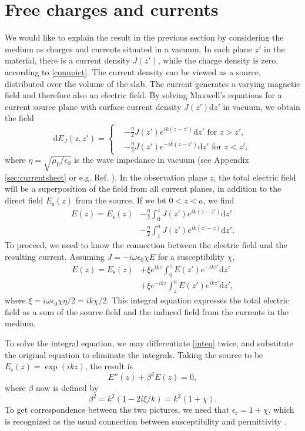 \documentclass[prb,twocolumn]{revtex4-1}
\newcommand{\diff}{\text{d}}
\newcommand{\be}{\begin{equation}}
\newcommand{\ee}{\end{equation}}
\begin{document}
\section{Free charges and currents}\label{sec:free}
We would like to explain the result in the previous section by considering the medium as charges and currents situated in a vacuum. In each plane $z'$ in the material, there is a current density $J(z')$, while the charge density is zero, according to \eqref{connpict}. The current density can be viewed as a source, distributed over the volume of the slab. The current generates a varying magnetic field and therefore also an electric field. By solving Maxwell's equations for a current source plane with surface current density $J(z')\diff z'$ in vacuum, we obtain the field
\be
\diff E_J(z,z') =
\begin{cases}
&-\frac{\eta}{2} J(z') e^{ik(z-z')} \diff z' \text{ for $z>z'$}, \\ 
&-\frac{\eta}{2} J(z') e^{-ik(z-z')} \diff z' \text{ for $z<z'$},
\end{cases}
\ee
where $\eta=\sqrt{\mu_0/\epsilon_0}$ is the wave impedance in vacuum (see Appendix \ref{sec:currentsheet} or e.g. Ref. \cite{pozar}). In the observation plane $z$, the total electric field will be a superposition of the field from all current planes, in addition to the direct field $E_\text{s}(z)$ from the source. If we let $0<z<a$, we find
\begin{align}
E(z) = E_\text{s}(z) &- \frac{\eta}{2}\int_{0}^z J(z')e^{ik(z-z')}\diff z' \nonumber\\ 
&- \frac{\eta}{2}\int_{z}^a J(z')e^{ik(z'-z)}\diff z'.
\end{align}
To proceed, we need to know the connection between the electric field and the resulting current. Assuming $J=-i\omega\epsilon_0\chi E$ for a susceptibility $\chi$,
\begin{align}\label{inteq}
E(z)= E_\text{s}(z) &+ \xi e^{ikz}\int_{0}^z E(z')e^{-ikz'}\diff z' \nonumber\\ 
&+ \xi e^{-ikz}\int_{z}^a E(z')e^{ikz'}\diff z',
\end{align}
where $\xi=i\omega\epsilon_0\chi\eta/2=i k\chi/2$. This integral equation expresses the total electric field as a sum of the source field and the induced field from the currents in the medium. 

To solve the integral equation, we may differentiate \eqref{inteq} twice, and substitute the original equation to eliminate the integrals. Taking the source to be $E_\text{s}(z)=\exp(ikz)$, the result is
\be\label{diffpict2}
E''(z)+\beta^2 E(z) = 0,
\ee
where $\beta$ now is defined by 
\be
\beta^2=k^2\left(1-2i\xi/k\right)=k^2\left(1+\chi\right).
\ee
To get correspondence between the two pictures, we need that $\epsilon_\text{r}=1+\chi$, which is recognized as the usual connection between susceptibility and permittivity \cite{landau_lifshitz_edcm,jackson}.
\end{document}
